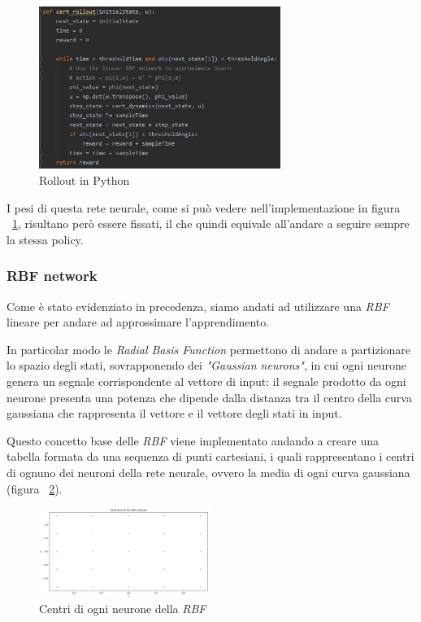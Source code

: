 \begin{figure}[!h]
	\centering
	\includegraphics[width=0.7\textwidth]{Immagini/Rollout.JPG}
	\caption{Rollout in Python}
	\label{fig:roll_py}
\end{figure}

I pesi di questa rete neurale, come si può vedere nell'implementazione in figura ~\ref{fig:roll_py}, risultano però essere fissati, il che quindi equivale all'andare a seguire sempre la stessa policy.
\subsubsection{RBF network}
\label{sec:RBF}
Come è stato evidenziato in precedenza, siamo andati ad utilizzare una \textit{RBF} lineare per andare ad approssimare l'apprendimento.

In particolar modo le \textit{Radial Basis Function} permettono di andare a partizionare lo spazio degli stati, sovrapponendo dei \textit{"Gaussian neurons"}, in cui ogni neurone genera un segnale corrispondente al vettore di input: il segnale prodotto da ogni neurone presenta una potenza che dipende dalla distanza tra il centro della curva gaussiana che rappresenta il vettore e il vettore degli stati in input.

Questo concetto base delle \textit{RBF} viene implementato andando a creare una tabella formata da una sequenza di punti cartesiani, i quali rappresentano i centri di ognuno dei neuroni della rete neurale, ovvero la media di ogni curva gaussiana (figura ~\ref{fig:RBF_Centrum}).

\begin{figure}[!h]
	\centering
	\includegraphics[width=0.5\textwidth]{Immagini/Centrum_of_RBF.JPG}
	\caption{Centri di ogni neurone della \textit{RBF}}
	\label{fig:RBF_Centrum}
\end{figure}

